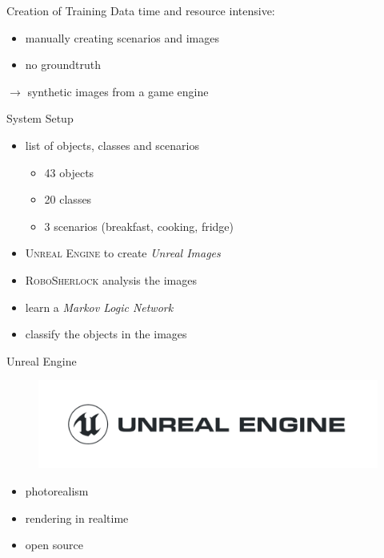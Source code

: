 \documentclass[]{beamer}
\begin{document}
\begin{frame}{Creation of Training Data}
time and resource intensive:
	\begin{itemize}
		\item manually creating scenarios and images
		\item no groundtruth
	\end{itemize}
	
$\rightarrow$ synthetic images from a game engine
\end{frame}

\begin{frame}{System Setup}
	\begin{itemize}
		\item list of objects, classes and scenarios
			\begin{itemize}
				\item 43 objects
				\item 20 classes
				\item 3 scenarios (breakfast, cooking, fridge)
			\end{itemize}
		\item \textsc{Unreal Engine} to create \textit{Unreal Images}
		\item \textsc{RoboSherlock} analysis the images
		\item learn a \textit{Markov Logic Network} 
		\item classify the objects in the images
	\end{itemize}
\end{frame}

\begin{frame}{Unreal Engine}
	\begin{figure}
		\includegraphics[scale=.15]{img/Unreal_Engine_Horiz_Black.png}
	\end{figure}	
	\begin{itemize}
		\item photorealism
		\item rendering in realtime
		\item open source
	\end{itemize}
\end{frame}
\end{document}
